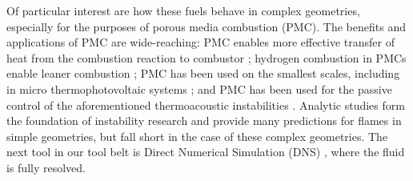 Of particular interest are how these fuels behave in complex geometries, especially for the purposes of porous media combustion (PMC). The benefits and applications of PMC are wide-reaching: PMC enables more effective transfer of heat from the combustion reaction to combustor \cite{mujeebu2009CombustionPorousMedia}; hydrogen combustion in PMCs enable leaner combustion \cite{tseng2002EffectsHydrogenAddition}; PMC has been used on the smallest scales, including in micro thermophotovoltaic systems \cite{pan2015HydrogenOxygenPremixed}; and PMC has been used for the passive control of the aforementioned thermoacoustic instabilities \cite{meadows2015PorousInsertsPassive, dowd2018ThermoacousticInstabilityModel}. Analytic studies form the foundation of instability research and provide many predictions for flames in simple geometries, but fall short in the case of these complex geometries. The next tool in our tool belt is Direct Numerical Simulation (DNS) \cite{orszag1970AnalyticalTheoriesTurbulence}, where the fluid is fully resolved.





